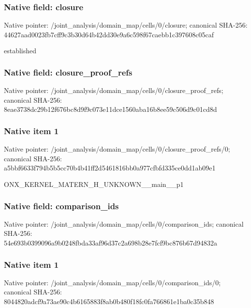 \documentclass[10pt,a4paper]{article}
\begin{document}
\subsubsection{Native field: closure}
Native pointer: /joint\_\allowbreak{}analysis/domain\_\allowbreak{}map/cells/0/closure; canonical SHA-256: 44627aad0023fb7cff9c3b30d64b42dd30e9a6c598f67caebb1c397608c05caf

\begingroup\raggedright\sloppy established\par\endgroup

\subsubsection{Native field: closure\_\allowbreak{}proof\_\allowbreak{}refs}
Native pointer: /joint\_\allowbreak{}analysis/domain\_\allowbreak{}map/cells/0/closure\_\allowbreak{}proof\_\allowbreak{}refs; canonical SHA-256: 8eae3738dc29b12f676bc8d9f9c073e11dce1560aba16b8ee59c506d9c01cd8d

\subsubsection{Native item 1}
Native pointer: /joint\_\allowbreak{}analysis/domain\_\allowbreak{}map/cells/0/closure\_\allowbreak{}proof\_\allowbreak{}refs/0; canonical SHA-256: a5bbf6633f794b5b5cc70b4b41ff2d5461816bb0a977cfbfd335ce0dd1ab09e1

\begingroup\raggedright\sloppy ONX\_\allowbreak{}KERNEL\_\allowbreak{}MATERN\_\allowbreak{}H\_\allowbreak{}UNKNOWN\_\allowbreak{}\_\allowbreak{}main\_\allowbreak{}\_\allowbreak{}p1\par\endgroup

\subsubsection{Native field: comparison\_\allowbreak{}ids}
Native pointer: /joint\_\allowbreak{}analysis/domain\_\allowbreak{}map/cells/0/comparison\_\allowbreak{}ids; canonical SHA-256: 54e693b0399096a9b0248fbda33af96d37c2a698b28e7fcf9bc876b67d94832a

\subsubsection{Native item 1}
Native pointer: /joint\_\allowbreak{}analysis/domain\_\allowbreak{}map/cells/0/comparison\_\allowbreak{}ids/0; canonical SHA-256: 8044820adcf9a73ae90c4b6165883f8ab0b480f18fc0fa766861e1ba0c35b848
\end{document}
